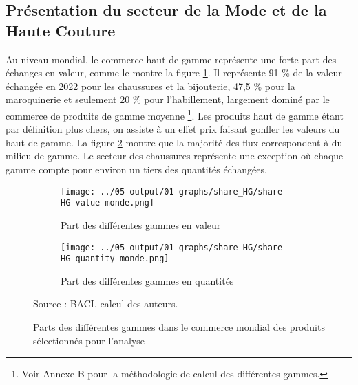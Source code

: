 \documentclass[french,10pt,a4paper]{article}
\begin{document}
\subsection{Présentation du secteur de la Mode et de la Haute Couture}

Au niveau mondial, le commerce haut de gamme représente une forte part des échanges en valeur, comme le montre la figure \ref{fig:share-HG-value-monde}. Il représente 91 \% de la valeur échangée en 2022 pour les chaussures et la bijouterie, 47,5 \% pour la maroquinerie et seulement 20 \% pour l'habillement, largement dominé par le commerce de produits de gamme moyenne \footnote{Voir Annexe B pour la méthodologie de calcul des différentes gammes.}. Les produits haut de gamme étant par définition plus chers, on assiste à un effet prix faisant gonfler les valeurs du haut de gamme. La figure \ref{fig:share-HG-quantity-monde} montre que la majorité des flux correspondent à du milieu de gamme. Le secteur des chaussures représente une exception où chaque gamme compte pour environ un tiers des quantités échangées.

\begin{figure}[!h]
  \centering
  \begin{subfigure}{\textwidth}
    \centering    
    \texttt{[image: ../05-output/01-graphs/share\_HG/share-HG-value-monde.png]}
    \caption{Part des différentes gammes en valeur}
    \label{fig:share-HG-value-monde}
  \end{subfigure}
  \vspace{0.5cm}
  \begin{subfigure}{\textwidth}
    \centering
 \texttt{[image: ../05-output/01-graphs/share\_HG/share-HG-quantity-monde.png]}
 \caption{Part des différentes gammes en quantités}
 \label{fig:share-HG-quantity-monde}
\end{subfigure}
\captionsetup{justification=raggedright,singlelinecheck=false, font=small}
  \caption*{Source : BACI, calcul des auteurs.}
  \captionsetup{justification=centering, singlelinecheck=true, font=normalsize}
  \caption{Parts des différentes gammes dans le commerce mondial des produits sélectionnés pour l'analyse}
  \label{fig:share-HG-value-quantity-monde}
\end{figure}

\bigskip
\end{document}
